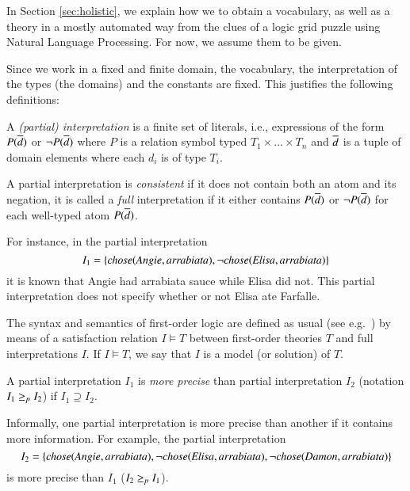 In Section \ref{sec:holistic}, we explain how we to obtain a vocabulary, as well as a theory in a mostly automated way from the clues of  a logic grid puzzle using Natural Language Processing. For now, we assume them to be given.



Since we work in a fixed and finite domain, the vocabulary, the interpretation of the types (the domains) and the constants are fixed.
This justifies the following definitions: 
\begin{definition}\label{def:partial-interpretation}
 A \emph{(partial) interpretation} is a finite set of literals, i.e., expressions of the form $P(\overline{d})$ or $\lnot P(\overline{d})$ where $P$ is a relation symbol typed $T_1\times\dots \times T_n$ and $\overline{d}$ is a tuple of domain elements where each $d_i$ is of type $T_i$. 
\end{definition}
 \begin{definition}\label{def:consistent}
 A partial interpretation is \emph{consistent} if it does not contain both an atom and its negation, it is called a \emph{full} interpretation if it either contains $P(\overline{d})$ or $\lnot P(\overline{d})$ for each well-typed atom $P(\overline{d})$. 
\end{definition}

For instance, in the partial interpretation 
\[ 
I_1=\{\mathit{chose}(\mathit{Angie},\mathit{arrabiata}), \lnot \mathit{chose}(\mathit{Elisa},\mathit{arrabiata})\}
 \] 
it is known that Angie had arrabiata sauce while Elisa did not. This partial interpretation does not specify whether or not Elisa ate Farfalle.  


The syntax and semantics of first-order logic are defined as usual (see e.g.\ \cite{enderton}) by means of a satisfaction relation $I \models T$ between first-order theories $T$ and full interpretations $I$. If $I\models T$, we say that $I$ is a model (or solution) of $T$.


\begin{definition} %
	A partial interpretation $I_1$ is \emph{more precise} than partial interpretation $I_2$ (notation $I_1\geq_p I_2$) if $I_1\supseteq I_2$.
\end{definition}

Informally, one partial interpretation is more precise than another if it contains more information. For example, the partial interpretation 
\[I_2 =\{\mathit{chose}(\mathit{Angie},  \mathit{arrabiata}), \lnot \mathit{chose}(\mathit{Elisa},\mathit{arrabiata}),  \lnot \mathit{chose}(\mathit{Damon},\mathit{arrabiata})\}\]
is more precise than $I_1$ ($I_2 \geq_p I_1$).


